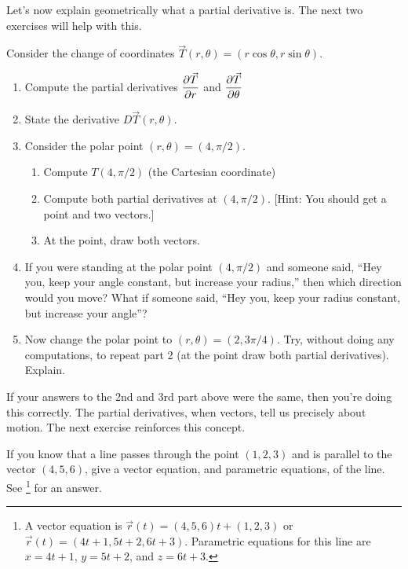 Let's now explain geometrically what a partial derivative is. The next two exercises will help with this.
\begin{problem}
 Consider the change of coordinates $\vec T(r,\theta) = (r\cos \theta, r\sin \theta)$.
\begin{enumerate}
	\item Compute the partial derivatives $\displaystyle\frac{\partial \vec T}{\partial r}$ and $\displaystyle\frac{\partial \vec T}{\partial \theta}$
	\item State the derivative $D\vec T(r,\theta)$. 
	\item Consider the polar point $(r,\theta) = (4,\pi/2)$. 
	\begin{enumerate}
		\item Compute $T(4,\pi/2)$ (the Cartesian coordinate)
		\item Compute both partial derivatives at $(4,\pi/2)$. [Hint: You should get a point and two vectors.]
		\item At the point, draw both vectors.
	\end{enumerate}
 \item If you were standing at the polar point $(4,\pi/2)$ and someone said, ``Hey you, keep your angle constant, but increase your radius,'' then which direction would you move?  What if someone said, ``Hey you, keep your radius constant, but increase your angle''?
 \item Now change the polar point to $(r,\theta) = (2,3\pi/4)$.  Try, without doing  any computations, to repeat part 2 (at the point draw both partial derivatives). Explain.
\end{enumerate}
\end{problem}

If your answers to the 2nd and 3rd part above were the same, then you're doing this correctly.  The partial derivatives, when vectors, tell us precisely about motion. The next exercise reinforces this concept.

\begin{review*}
 If you know that a line passes through the point $(1,2,3)$ and is parallel to the vector $(4,5,6)$, give a vector equation, and parametric equations, of the line. See \footnote{A vector equation is $\vec r(t) = (4,5,6)t+(1,2,3)$ or $\vec r(t) = (4t+1, 5t+2, 6t+3)$.  Parametric equations for this line are 
$x=4t+1$, $y=5t+2$, and $z=6t+3$. 
} for an answer.
\end{review*}


